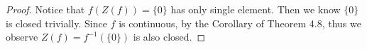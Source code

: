 \begin{Exercise}
\begin{proof}
Notice that $f(Z(f)) = \{0\}$ has only single element. Then we know $\{0\}$ is closed trivially. Since $f$ is continuous, by the Corollary of Theorem 4.8, thus we observe $Z(f) = f^{-1}(\{0\})$ is also closed.
\end{proof}
\end{Exercise}